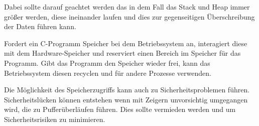 Dabei sollte darauf geachtet werden das in dem Fall das Stack und Heap immer größer werden, diese ineinander laufen und dies zur gegenseitigen Überschreibung der Daten führen kann. \par
Fordert ein C-Programm Speicher bei dem Betriebssystem an, interagiert diese mit dem Hardware-Speicher und reserviert einen Bereich im Speicher für das Programm.
Gibt das Programm den Speicher wieder frei, kann das Betriebssystem diesen recyclen und für andere Prozesse verwenden\cite{stackandheap:2022}. \par
Die Möglichkeit des Speicherzugriffs kann auch zu Sicherheitsproblemen führen.
Sicherheitslücken können entstehen wenn mit Zeigern unvorsichtig umgegangen wird, die zu Pufferüberläufen führen.
Dies sollte vermieden werden und um Sicherheitsrisiken zu minimieren\cite{boekelmann:2023}.

